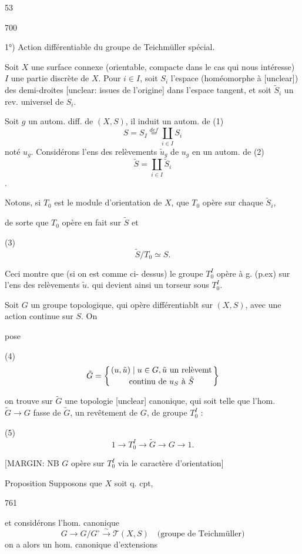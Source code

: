 \newpage


53

700

1°) Action différentiable du groupe de Teichmüller spécial.

Soit $X$ une surface connexe (orientable, compacte dans le cas qui nous intéresse) $I$ une partie discrète de $X$. Pour $i \in I$, soit $S_i$ l'espace (homéomorphe à [unclear]) des demi-droites [unclear: issues de l'origine] dans l'espace tangent, et soit $\tilde{S}_i$ un rev. universel de $S_i$.

Soit $g$ un autom. diff. de $(X,S)$,
il induit un autom. de
(1) $$S = S_I \overset{def}{=} \coprod_{i \in I} S_i$$
noté $u_g$. Considérons l'ens des relèvements $\tilde{u}_g$ de $u_g$ en un autom. de
(2) $$\tilde{S} = \coprod_{i \in I} \tilde{S}_i$$ .

Notons, si $T_0$ est le module d'orientation de $X$, que $T_0$ opère sur chaque $\tilde{S}_i$,

\newpage


de sorte que $T_0$ opère en fait sur $\tilde{S}$ et

(3) $$ \tilde{S}/T_0 \simeq S . $$

Ceci montre que (si on est comme ci-
dessus) le groupe $T_0^I$ opère à g.
(p.ex) sur l'ens des relèvements $\tilde{u}$.
qui devient ainsi un torseur sous
$T_0^I$.

Soit $G$ un groupe topologique,
qui opère différentiablt sur $(X,S)$, avec
une action continue sur $S$. On

pose

(4) $$ \tilde{G} = \left\{ (u, \tilde{u}) \mid u \in G, \tilde{u} \text{ un relèvemt} \atop \text{continu de } u_S \text{ à } \tilde{S} \right\} $$

on trouve sur $\tilde{G}$ une topologie
[unclear]
canonique, qui soit telle que
l'hom. $\tilde{G} \to G$ fasse de
$\tilde{G}$, un
revêtement de $G$, de groupe $T_0^I$ :

(5) $$ 1 \to T_0^I \to \tilde{G} \to G \to 1 . $$

[MARGIN: NB $G$ opère sur $T_0^I$ via le caractère d'orientation]

Proposition Supposons que $X$ soit q. cpt,

\newpage


761

et considérons l'hom. canonique
$$ G \longrightarrow G/G^\circ \xrightarrow{\sim} \mathcal{T}(X,S) \quad \text{(groupe de Teichmüller)} $$
on a alors un hom.
canonique d'extensions

